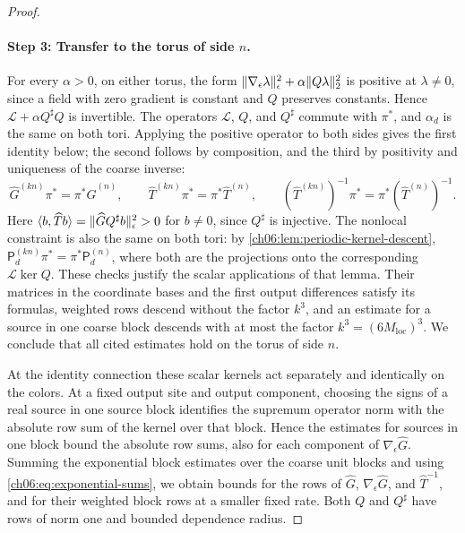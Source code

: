 \begin{proof}
\paragraph{Step 3: Transfer to the torus of side $n$.}
For every $\alpha>0$, on either torus, the form $\lVert \nabla_\epsilon\lambda\rVert_\epsilon^2+\alpha\lVert Q\lambda\rVert_2^2$ is positive at $\lambda\ne0$, since a field with zero gradient is constant and $Q$ preserves constants. Hence $\mathscr L+\alpha Q^\sharp Q$ is invertible. The operators $\mathscr L$, $Q$, and $Q^\sharp$ commute with $\pi^*$, and $\alpha_d$ is the same on both tori. Applying the positive operator to both sides gives the first identity below; the second follows by composition, and the third by positivity and uniqueness of the coarse inverse:
\begin{equation}\label{ch06:eq:scalar-cover-identities}
 \widehat G^{(kn)}\pi^*=\pi^*\widehat G^{(n)},\qquad\widehat T^{(kn)}\pi^*=\pi^*\widehat T^{(n)},\qquad(\widehat T^{(kn)})^{-1}\pi^*=\pi^*(\widehat T^{(n)})^{-1}.
\end{equation}
Here $\langle b,\widehat Tb\rangle=\lVert \widehat GQ^\sharp b\rVert_\epsilon^2>0$ for $b\ne0$, since $Q^\sharp$ is injective. The nonlocal constraint is also the same on both tori: by \cref{ch06:lem:periodic-kernel-descent}, $\mathsf P_d^{(kn)}\pi^*=\pi^*\mathsf P_d^{(n)}$, where both are the projections onto the corresponding $\mathscr L\ker Q$. These checks justify the scalar applications of that lemma. Their matrices in the coordinate bases and the first output differences satisfy its formulas, weighted rows descend without the factor $k^3$, and an estimate for a source in one coarse block descends with at most the factor $k^3=(6M_{\mathrm{loc}})^3$. We conclude that all cited estimates hold on the torus of side $n$.

At the identity connection these scalar kernels act separately and identically on the colors. At a fixed output site and output component, choosing the signs of a real source in one source block identifies the supremum operator norm with the absolute row sum of the kernel over that block. Hence the estimates for sources in one block bound the absolute row sums, also for each component of $\nabla_\epsilon\widehat G$. Summing the exponential block estimates over the coarse unit blocks and using \eqref{ch06:eq:exponential-sums}, we obtain bounds for the rows of $\widehat G$, $\nabla_\epsilon\widehat G$, and $\widehat T^{-1}$, and for their weighted block rows at a smaller fixed rate. Both $Q$ and $Q^\sharp$ have rows of norm one and bounded dependence radius.


\end{proof}
